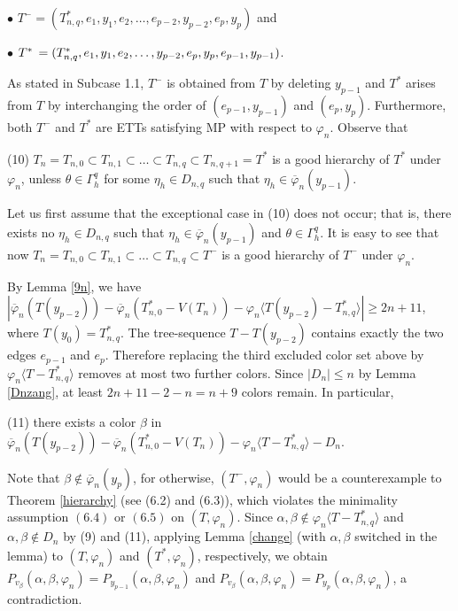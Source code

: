 \documentclass[11pt]{article}
\newcommand{\phibar}{\overline{\varphi}}
\begin{document}
\vskip 1mm
$\bullet$ $T^-=(T_{n,q}^*, e_1, y_1, e_2, \ldots, e_{p-2}, y_{p-2}, e_p, y_p)$ and

\vskip 1mm
$\bullet$ $T^* \hskip 0.6mm =(T_{n,q}^*, e_1, y_1, e_2, \ldots ,y_{p-2}, e_p, y_p, e_{p-1}, y_{p-1})$.

\vskip 1mm
\noindent As stated in Subcase 1.1, $T^-$ is obtained from $T$ by deleting $y_{p-1}$ and $T^*$ arises from $T$ by 
interchanging the order of $(e_{p-1}, y_{p-1})$ and $(e_p, y_p)$.  Furthermore, both $T^-$ and $T^*$ 
are ETTs satisfying MP with respect to $\varphi_n$. Observe that 

(10) $T_n=T_{n,0} \subset T_{n,1} \subset \ldots \subset T_{n,q} \subset T_{n,q+1}=T^*$ is a good hierarchy 
of $T^*$ under $\varphi_n$, unless $\theta\in \Gamma^{q}_h$ for some $\eta_h\in D_{n,q}$ such that $\eta_h 
\in\phibar_n(y_{p-1})$. 

Let us first assume that the exceptional case in (10) does not occur; that is, there exists no $\eta_h\in D_{n,q}$ such 
that $\eta_h \in\phibar_n(y_{p-1})$ and $\theta\in \Gamma^{q}_h$. It is easy to see that now
$T_n=T_{n,0} \subset T_{n,1} \subset \ldots \subset T_{n,q} \subset T^-$ is a good hierarchy of $T^-$ under $\varphi_n$. 

By Lemma \ref{9n}, we have
$|\overline{\varphi}_n(T(y_{p-2}))- \overline{\varphi}_n(T_{n,0}^*-V(T_n)) - \varphi_n \langle T(y_{p-2}) - T_{n,q}^* \rangle |
\geq 2n+11$, where $T(y_0)=T_{n,q}^*$. The tree-sequence $T-T(y_{p-2})$ contains exactly the two edges
$e_{p-1}$ and $e_p$. Therefore replacing the third excluded color set above by
$\varphi_n\langle T-T_{n,q}^*\rangle$ removes at most two further colors. Since $|D_n|\le n$ by
Lemma \ref{Dnzang}, at least $2n+11-2-n=n+9$ colors remain. In particular,

(11) there exists a color $\beta$ in $\overline{\varphi}_n(T(y_{p-2}))- \overline{\varphi}_n(T_{n,0}^*-V(T_n))-
\varphi_n \langle T - T_{n,q}^* \rangle-D_n$.  

\noindent Note that $\beta \notin \overline{\varphi}_n(y_p)$, for otherwise, $(T^-, \varphi_n)$  would be 
a counterexample to Theorem \ref{hierarchy} (see (6.2) and (6.3)), which violates the minimality assumption
$(6.4)$ or $(6.5)$ on $(T, \varphi_n)$. Since $\alpha, \beta \notin \varphi_n \langle T - T_{n,q}^* \rangle$ and $\alpha,\beta\notin D_n$ by (9) and (11), applying Lemma \ref{change} (with $\alpha,\beta$ switched in the lemma) to $(T, \varphi_n)$ and $(T^*, \varphi_n)$, respectively, we obtain 
$P_{v_{\beta}}(\alpha,\beta,\varphi_n)=P_{y_{p-1}}(\alpha,\beta,\varphi_n)$
and $P_{v_{\beta}}(\alpha,\beta,\varphi_n)=P_{y_{p}}(\alpha,\beta,\varphi_n)$, a contradiction.
\end{document}
